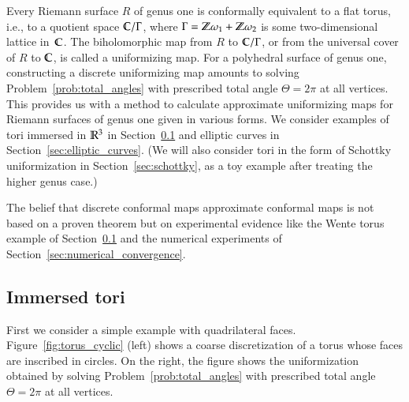 \documentclass[Thesis]{subfiles}
\begin{document}
Every Riemann surface $R$ of genus one is conformally equivalent to a
flat torus, i.e., to a quotient space $\mathbb C/\Gamma$, where
$\Gamma=\mathbb Z\omega_{1}+\mathbb Z\omega_{2}$ is some two-dimensional lattice
in~$\mathbb C$. The biholomorphic map from $R$ to $\mathbb C/\Gamma$, or from the
universal cover of $R$ to $\mathbb C$, is called a uniformizing map. For a
polyhedral surface of genus one, constructing a discrete uniformizing
map amounts to solving Problem~\ref{prob:total_angles} with prescribed
total angle $\Theta=2\pi$ at all vertices. This provides us with a
method to calculate approximate uniformizing maps for Riemann surfaces
of genus one given in various forms. We consider examples of tori
immersed in $\mathbb R^{3}$ in Section~\ref{sec:immersed_tori} and elliptic
curves in Section~\ref{sec:elliptic_curves}. (We will also consider
tori in the form of Schottky uniformization in
Section~\ref{sec:schottky}, as a toy example after treating the higher
genus case.)

The belief that discrete conformal maps approximate conformal maps is
not based on a proven theorem but on experimental evidence like the
Wente torus example of Section~\ref{sec:immersed_tori} and the
numerical experiments of Section~\ref{sec:numerical_convergence}. 

\subsection{Immersed tori}
\label{sec:immersed_tori}



First we consider a simple example with quadrilateral faces.
Figure~\ref{fig:torus_cyclic} (left) shows a coarse discretization of
a torus whose faces are inscribed in circles. On the right, the figure shows the
uniformization obtained by solving Problem~\ref{prob:total_angles}
with prescribed total angle $\Theta=2\pi$ at all vertices.
\end{document}
